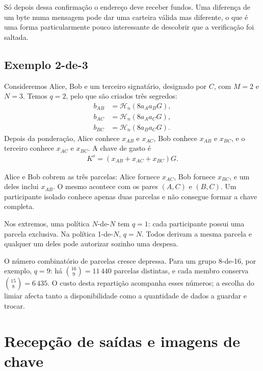 Só depois dessa confirmação o endereço deve receber fundos. Uma diferença de
um byte numa mensagem pode dar uma carteira válida mas diferente, o que é uma
forma particularmente pouco interessante de descobrir que a verificação foi
saltada.

\subsection{Exemplo 2-de-3}
\label{sec:n-1-of-n}

%
Consideremos Alice, Bob e um terceiro signatário, designado por \(C\), com \(M=2\) e \(N=3\). Temos \(q=2\), pelo
que são criados três segredos:
\begin{align*}
 b_{AB}&=\mathcal H_n(8a_Aa_BG),\\
 b_{AC}&=\mathcal H_n(8a_Aa_CG),\\
 b_{BC}&=\mathcal H_n(8a_Ba_CG).
\end{align*}
Depois da ponderação, Alice conhece \(x_{AB}\) e \(x_{AC}\), Bob conhece
\(x_{AB}\) e \(x_{BC}\), e o terceiro conhece \(x_{AC}\) e \(x_{BC}\). A chave de
gasto é
\begin{align*}
 K^s=(x_{AB}+x_{AC}+x_{BC})G.
\end{align*}

Alice e Bob cobrem as três parcelas: Alice fornece \(x_{AC}\), Bob fornece
\(x_{BC}\), e um deles inclui \(x_{AB}\). O mesmo acontece com os pares
\((A,C)\) e \((B,C)\). Um participante isolado conhece apenas duas parcelas e
não consegue formar a chave completa.

Nos extremos, uma política \(N\)-de-\(N\) tem \(q=1\): cada participante
possui uma parcela exclusiva. Na política 1-de-\(N\), \(q=N\). Todos
derivam a mesma parcela e qualquer um deles pode autorizar sozinho uma despesa.

O número combinatório de parcelas cresce depressa. Para um grupo 8-de-16,
por exemplo, \(q=9\): há \(\binom{16}{9}=11\,440\) parcelas distintas, e
cada membro conserva \(\binom{15}{8}=6\,435\). O custo desta repartição
acompanha esses números; a escolha do limiar afecta tanto a disponibilidade
como a quantidade de dados a guardar e trocar.



\section{Recepção de saídas e imagens de chave}
\label{sec:recalculating-key-images-multisig}

